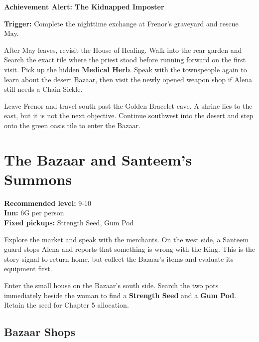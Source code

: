 \documentclass[
  american,
  10pt,
  letterpaper,
  oneside,
  open=any]{scrreprt}
\begin{document}
\begin{achievementalert}

\textbf{Achievement Alert: The Kidnapped Imposter}

\textbf{Trigger:} Complete the nighttime exchange at Frenor's graveyard
and rescue May.

\end{achievementalert}

After May leaves, revisit the House of Healing. Walk into the rear
garden and Search the exact tile where the priest stood before running
forward on the first visit. Pick up the hidden \textbf{Medical Herb}.
Speak with the townspeople again to learn about the desert Bazaar, then
visit the newly opened weapon shop if Alena still needs a Chain Sickle.

Leave Frenor and travel south past the Golden Bracelet cave. A shrine
lies to the east, but it is not the next objective. Continue southwest
into the desert and step onto the green oasis tile to enter the Bazaar.

\section{The Bazaar and Santeem's
Summons}\label{the-bazaar-and-santeems-summons}

\textbf{Recommended level:} 9-10\\
\textbf{Inn:} 6G per person\\
\textbf{Fixed pickups:} Strength Seed, Gum Pod

Explore the market and speak with the merchants. On the west side, a
Santeem guard stops Alena and reports that something is wrong with the
King. This is the story signal to return home, but collect the Bazaar's
items and evaluate its equipment first.

Enter the small house on the Bazaar's south side. Search the two pots
immediately beside the woman to find a \textbf{Strength Seed} and a
\textbf{Gum Pod}. Retain the seed for Chapter 5 allocation.

\subsection{Bazaar Shops}\label{bazaar-shops}
\end{document}
